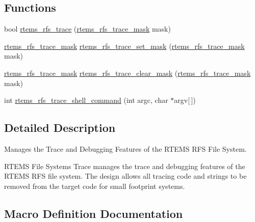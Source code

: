 \subsection*{Functions}
\begin{DoxyCompactItemize}
\item 
bool \mbox{\hyperlink{rtems-rfs-trace_8h_ac3ad3d65a0c8d230ec5b076c78f09fd2}{rtems\+\_\+rfs\+\_\+trace}} (\mbox{\hyperlink{rtems-rfs-trace_8h_a9428edf7367b99bacef5e6d985540cae}{rtems\+\_\+rfs\+\_\+trace\+\_\+mask}} mask)
\item 
\mbox{\hyperlink{rtems-rfs-trace_8h_a9428edf7367b99bacef5e6d985540cae}{rtems\+\_\+rfs\+\_\+trace\+\_\+mask}} \mbox{\hyperlink{rtems-rfs-trace_8h_ac65461ca50026e1098d4125d6746ca80}{rtems\+\_\+rfs\+\_\+trace\+\_\+set\+\_\+mask}} (\mbox{\hyperlink{rtems-rfs-trace_8h_a9428edf7367b99bacef5e6d985540cae}{rtems\+\_\+rfs\+\_\+trace\+\_\+mask}} mask)
\item 
\mbox{\hyperlink{rtems-rfs-trace_8h_a9428edf7367b99bacef5e6d985540cae}{rtems\+\_\+rfs\+\_\+trace\+\_\+mask}} \mbox{\hyperlink{rtems-rfs-trace_8h_af9ffa9ff2496f9237093929f0a54a688}{rtems\+\_\+rfs\+\_\+trace\+\_\+clear\+\_\+mask}} (\mbox{\hyperlink{rtems-rfs-trace_8h_a9428edf7367b99bacef5e6d985540cae}{rtems\+\_\+rfs\+\_\+trace\+\_\+mask}} mask)
\item 
int \mbox{\hyperlink{rtems-rfs-trace_8h_a9479078c6eec01008c62b45b5b7e0a81}{rtems\+\_\+rfs\+\_\+trace\+\_\+shell\+\_\+command}} (int argc, char $\ast$argv\mbox{[}$\,$\mbox{]})
\end{DoxyCompactItemize}


\subsection{Detailed Description}
Manages the Trace and Debugging Features of the R\+T\+E\+MS R\+FS File System. 

R\+T\+E\+MS File Systems Trace manages the trace and debugging features of the R\+T\+E\+MS R\+FS file system. The design allows all tracing code and strings to be removed from the target code for small footprint systems. 

\subsection{Macro Definition Documentation}
\mbox{\label{rtems-rfs-trace_8h_ad7b887d246c5da3cb12c3399356e553b}} 
